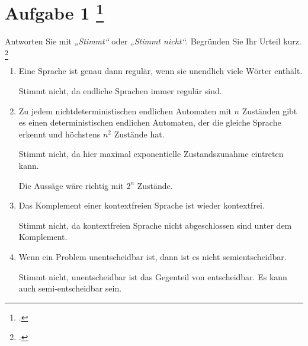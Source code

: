 \documentclass{lehramt-informatik-aufgabe}
\begin{document}
\liAufgabenTitel{}
\section{Aufgabe 1
\footcite{examen:66115:2020:09}}


Antworten Sie mit \emph{„Stimmt“} oder \emph{„Stimmt nicht“}. Begründen
Sie Ihr Urteil kurz.
\footcite[Seite 55-56]{theo:fs:4}
\begin{enumerate}


\item Eine Sprache ist genau dann regulär, wenn sie unendlich viele
Wörter enthält.

\begin{liAntwort}
Stimmt nicht, da endliche Sprachen immer regulär sind.
\end{liAntwort}


\item Zu jedem nichtdeterministischen endlichen Automaten mit $n$
Zuständen gibt es einen deterministischen endlichen Automaten, der die
gleiche Sprache erkennt und höchstens $n^2$ Zustände hat.

\begin{liAntwort}
Stimmt nicht, da hier maximal exponentielle Zustandszunahme eintreten
kann.

Die Aussäge wäre richtig mit $2^n$ Zustände.
\end{liAntwort}


\item Das Komplement einer kontextfreien Sprache ist wieder kontextfrei.

\begin{liAntwort}
Stimmt nicht, da kontextfreien Sprache nicht abgeschlossen sind unter
dem Komplement.
\end{liAntwort}


\item Wenn ein Problem unentscheidbar ist, dann ist es nicht
semientscheidbar.

\begin{liAntwort}
Stimmt nicht, unentscheidbar ist das Gegenteil von entscheidbar. Es kann
auch semi-entscheidbar sein.
\end{liAntwort}


\end{enumerate}
\end{document}
